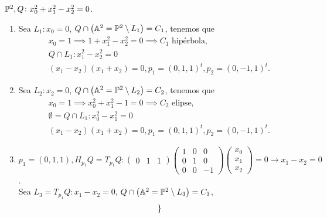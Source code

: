 \begin{example}
    $\mathbb{P}^2, Q \colon x_0^2 + x_1^2 - x_2^2 = 0$.
    \begin{enumerate}
        \item Sea $L_1 \colon x_0 = 0$, $Q\cap \left( \mathbb{A}^2 = \mathbb{P}^2 \setminus L_1 \right) = C_1$, tenemos que
            \begin{gather*}
                x_0 = 1 \implies 1+x_1^2 - x_2^2 = 0 \implies C_1 \text{ hipérbola}, \\
                Q \cap L_1 \colon x_1^2 - x_2^2 = 0 \\
                \left( x_1 -x_2 \right)\left( x_1 + x_2 \right) = 0, p_1 = \left( 0,1,1 \right)^t, p_2 = \left( 0,-1,1 \right)^t.
            \end{gather*}
        \item Sea $L_2 \colon x_2 = 0$, $Q\cap \left( \mathbb{A}^2 = \mathbb{P}^2 \setminus L_2 \right) = C_2$, tenemos que
            \begin{gather*}
                x_0 = 1 \implies x_0^2+x_1^2 - 1 = 0 \implies C_2 \text{ elipse}, \\
                \emptyset = Q \cap L_1 \colon x_0^2 - x_1^2 = 0 \\
                \left( x_1 -x_2 \right)\left( x_1 + x_2 \right) = 0, p_1 = \left( 0,1,1 \right)^t, p_2 = \left( 0,-1,1 \right)^t.
            \end{gather*}
        \item $p_1 = \left( 0,1,1 \right), H_{p_1}Q = T_{p_1}Q \colon
            \begin{pmatrix}
                0 & 1 & 1
            \end{pmatrix}
            \begin{pmatrix}
                1 & 0 & 0 \\
                0 & 1 & 0 \\
                0 & 0 & -1
            \end{pmatrix}
            \begin{pmatrix}
                x_0 \\ x_1 \\ x_2
            \end{pmatrix}
            = 0 \to x_1 - x_2 = 0$. \\
            Sea $L_3 = T_{p_1}Q \colon x_1 - x_2 = 0$, $Q\cap \left( \mathbb{A}^2 = \mathbb{P}^2 \setminus L_3 \right) = C_3$,
            \begin{gather*}
                \begin{rcases}

\end{rcases}
\end{gather*}
\end{enumerate}
\end{example}
